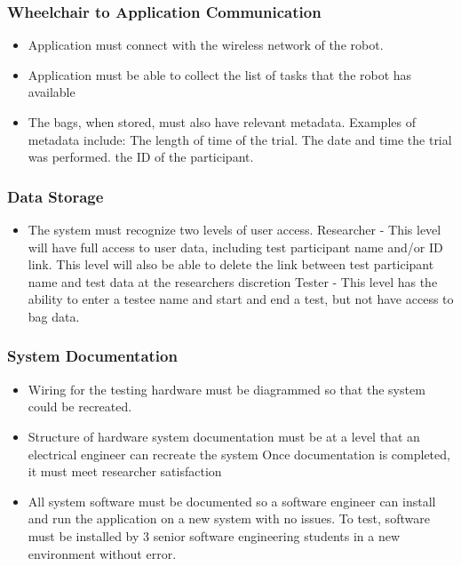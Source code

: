 \documentclass[onecolumn, draftclsnofoot,10pt, compsoc]{report}
\begin{document}
	\subsubsection{Wheelchair to Application Communication}
	\begin{itemize}
		\item Application must connect with the wireless network of the robot.
		\item Application must be able to collect the list of tasks that the robot has available
		\item The bags, when stored, must also have relevant metadata. Examples of metadata include:
		\subitem The length of time of the trial.
		\subitem The date and time the trial was performed.
		\subitem the ID of the participant.
	\end{itemize}
	\subsubsection{Data Storage}
	\begin{itemize}
		\item The system must recognize two levels of user access.
		\subitem Researcher - This level will have full access to user data, including test participant name and/or ID link.
		\subsubitem This level will also be able to delete the link between test participant name and test data at the researchers discretion
		\subitem Tester - This level has the ability to enter a testee name and start and end a test, but not have access to bag data.
	\end{itemize}
	\subsubsection{System Documentation}
	\begin{itemize}
		
		\item Wiring for the testing hardware must be diagrammed so that the system could be recreated. 
		\item Structure of hardware system documentation must be at a level that an electrical engineer can recreate the system
		\subitem Once documentation is completed, it must meet researcher satisfaction
		\item All system software must be documented so a software engineer can install and run the application on a new system with no issues. 
		\subitem To test, software must be installed by 3 senior software engineering students in a new environment without error. 
	\end{itemize}
\end{document}
